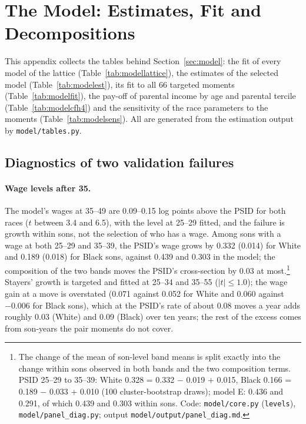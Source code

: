 \section{The Model: Estimates, Fit and Decompositions}\label{app:modelfit}

This appendix collects the tables behind Section~\ref{sec:model}: the fit of every model of the lattice
(Table~\ref{tab:modellattice}), the estimates of the selected model (Table~\ref{tab:modelest}), its fit to all 66
targeted moments (Table~\ref{tab:modelfit}), the pay-off of parental income by age and parental tercile
(Table~\ref{tab:modelcfh4}) and the sensitivity of the race parameters to the moments (Table~\ref{tab:modelsens}). All
are generated from the estimation output by \texttt{model/tables.py}.







\subsection{Diagnostics of two validation failures}\label{app:modeldiag}

\paragraph{Wage levels after 35.} The model's wages at 35--49
are 0.09--0.15 log points above the PSID for both races ($t$ between 3.4 and 6.5), with the level at 25--29 fitted, and
the failure is growth within sons, not the selection of who has a wage. Among sons with a wage at both 25--29 and
35--39, the PSID's wage grows by 0.332 (0.014) for White and 0.189 (0.018) for Black sons, against 0.439 and 0.303 in
the model; the composition of the two bands moves the PSID's cross-section by 0.03 at most.\footnote{The change of the
mean of son-level band means is split exactly into the change within sons observed in both bands and the two
composition terms. PSID 25--29 to 35--39: White 0.328 = 0.332 $-$ 0.019 + 0.015, Black 0.166 = 0.189 $-$ 0.033 + 0.010
(100 cluster-bootstrap draws); model E: 0.436 and 0.291, of which 0.439 and 0.303 within sons. Code:
\texttt{model/core.py} (\texttt{levels}), \texttt{model/panel\_diag.py}; output
\texttt{model/output/panel\_diag.md}.} Stayers' growth is targeted and fitted at 25--34 and 35--55 ($|t| \le 1.0$);
the wage gain at a move is overstated (0.071 against 0.052 for White and 0.060 against $-0.006$ for Black sons), which
at the PSID's rate of about 0.08 moves a year adds roughly 0.03 (White) and 0.09 (Black) over ten years; the rest of
the excess comes from son-years the pair moments do not cover.

